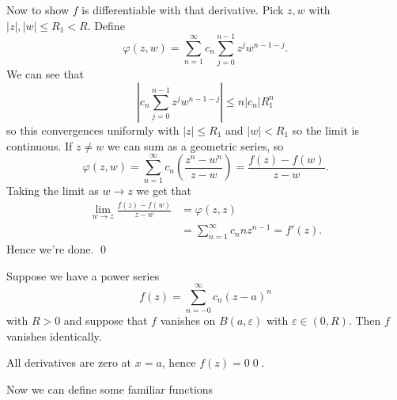 \documentclass{article}
\begin{document}
Now to show $ f $ is differentiable with that derivative. Pick $ z,w $ with $ |z|,|w|\le R_1< R $. Define
\[
	\varphi(z,w) = \sum_{n=1}^\infty c_n\sum_{j=0}^{n-1} z^j w^{n-1-j}.
\]
We can see that
\[
	\left|c_n\sum_{j=0}^{n-1} z^j w^{n-1-j}\right|\le n|c_n|R_1^n
\]
so this convergences uniformly with $ |z|\le R_1 $ and $ |w|<R_1 $ so the limit is continuous. If $ z\ne w $ we can sum as a geometric series, so
\[
	\varphi(z,w) = \sum_{n=1}^\infty c_n\left(\frac{z^n - w^n}{z-w}\right) = \frac{f(z)-f(w)}{z-w}.
\]
Taking the limit as $ w\to z $ we get that
\begin{align*}
\lim_{w\to z} \frac{f(z)-f(w)}{z-w} &= \varphi(z,z)\\
				    &= \sum_{n=1}^\infty c_n n z^{n-1} = f'(z).
\end{align*}
Hence we're done. \qed
\begin{corollary}
  Suppose we have a power series
  \[
	  f(z) = \sum_{n=-0}^\infty c_n(z-a)^n
  \]
  with $ R>0 $ and suppose that $ f $ vanishes on $ B(a,\varepsilon) $ with $ \varepsilon\in (0,R) $. Then $ f $ vanishes identically.
\end{corollary}
\pf All derivatives are zero at $ x=a $, hence $ f(z)=0 $\qed.
\par
Now we can define some familiar functions
\end{document}
